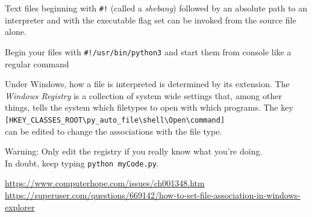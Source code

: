
\begin{frame}
%
\begin{hintbox}
\small
Text files beginning with \texttt{\#!} (called a \emph{shebang}) followed by an absolute path to an interpreter and with the executable flag set can be invoked from the source file alone.

Begin your files with \texttt{\#!/usr/bin/python3} and start them from console like a regular command
\end{hintbox}
%
\begin{hintbox}
\small
Under Windows, how a file is interpreted is determined by its extension. The \emph{Windows Registry} is a collection of system wide settings that, among other things, tells the system which filetypes to open with which programs. The key\\
\texttt{[HKEY\_CLASSES\_ROOT\textbackslash py\_auto\_file\textbackslash shell\textbackslash Open\textbackslash command]}\\
can be edited to change the associations with the file type.

\vspace{3pt}
Warning: Only edit the registry if you really know what you're doing.\\
In doubt, keep typing \texttt{python myCode.py}.

\vspace{3pt}
\scriptsize
\url{https://www.computerhope.com/issues/ch001348.htm}\\
\url{https://superuser.com/questions/669142/how-to-set-file-association-in-windows-explorer}
\end{hintbox}
%
\end{frame}


